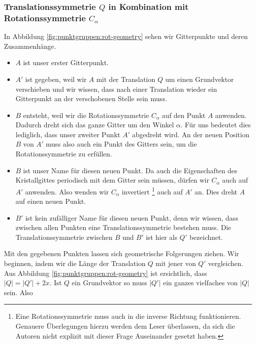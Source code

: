  \subsubsection{Translationssymmetrie $Q$ in Kombination mit Rotationssymmetrie $C_\alpha$}     %
 In Abbildung \ref{fig:punktgruppen:rot-geometry} sehen wir Gitterpunkte und deren Zusammenhänge.

 \begin{itemize}
     \item  $A$ ist unser erster Gitterpunkt. 

     \item  $A'$ ist gegeben, weil wir $A$ mit der Translation $Q$ um einen Grundvektor verschieben und wir wissen, 
            dass nach einer Translation wieder ein Gitterpunkt an der verschobenen Stelle sein muss.
     \item $B$ entsteht, weil wir die Rotationssymmetrie $C_\alpha$ auf den Punkt $A$ anwenden.
            Dadurch dreht sich das ganze Gitter um den Winkel $\alpha$. 
            Für uns bedeutet dies lediglich, dass unser zweiter Punkt $A'$ abgedreht wird.
            An der neuen Position $B$ von $A'$ muss also auch ein Punkt des  Gitters sein, um die Rotationssymmetrie zu erfüllen.
      \item $B$ ist unser Name für diesen neuen Punkt. 
            Da auch die Eigenschaften des Kristallgittes periodisch mit dem Gitter sein müssen, dürfen wir $C_\alpha$ auch auf $A'$ anwenden.
            Also wenden wir $C_\alpha$ invertiert
            \footnote{Eine Rotationssymmetrie muss auch in die inverse Richtung funktionieren. 
            Genauere Überlegungen hierzu werden dem Leser überlassen, da sich die Autoren nicht explizit mit dieser Frage Auseinander gesetzt haben.} 
            auch auf $A'$ an. 
            Dies dreht $A$ auf einen neuen Punkt.
     \item $B'$ ist kein zufälliger Name für diesen neuen Punkt, denn wir wissen, dass zwischen allen Punkten eine Translationssymmetrie bestehen muss.
            Die Translationssymmetrie zwischen $B$ und $B'$ ist hier als $Q'$ bezeichnet.
 \end{itemize}  
 Mit den gegebenen Punkten lassen sich geometrische Folgerungen ziehen.
 Wir beginnen, indem wir die Länge der Translation $Q$ mit jener von $Q'$ vergleichen.
 Aus Abbildung \ref{fig:punktgruppen:rot-geometry} ist ersichtlich, dass $|Q| = |Q'|+ 2x$.
 Ist $Q$ ein Grundvektor so muss $|Q'|$ ein ganzes vielfaches von $|Q|$ sein. Also 
